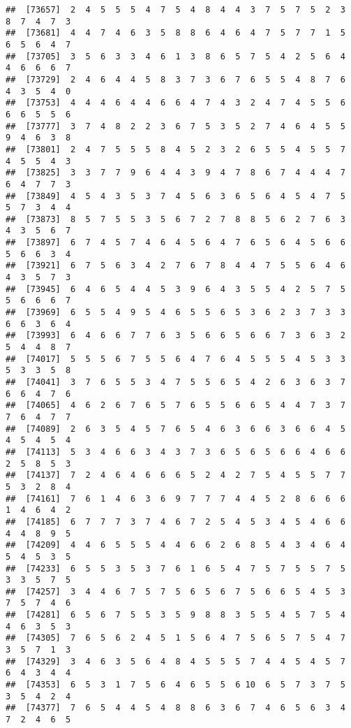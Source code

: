 \documentclass[
]{book}
\begin{document}
\begin{verbatim}
##  [73657]  2  4  5  5  5  4  7  5  4  8  4  4  3  7  5  7  5  2  3  8  7  4  7  3
##  [73681]  4  4  7  4  6  3  5  8  8  6  4  6  4  7  5  7  7  1  5  6  5  6  4  7
##  [73705]  3  5  6  3  3  4  6  1  3  8  6  5  7  5  4  2  5  6  4  4  6  6  6  7
##  [73729]  2  4  6  4  4  5  8  3  7  3  6  7  6  5  5  4  8  7  6  4  3  5  4  0
##  [73753]  4  4  4  6  4  4  6  6  4  7  4  3  2  4  7  4  5  5  6  6  6  5  5  6
##  [73777]  3  7  4  8  2  2  3  6  7  5  3  5  2  7  4  6  4  5  5  9  4  6  3  8
##  [73801]  2  4  7  5  5  5  8  4  5  2  3  2  6  5  5  4  5  5  7  4  5  5  4  3
##  [73825]  3  3  7  7  9  6  4  4  3  9  4  7  8  6  7  4  4  4  7  6  4  7  7  3
##  [73849]  4  5  4  3  5  3  7  4  5  6  3  6  5  6  4  5  4  7  5  5  7  3  4  4
##  [73873]  8  5  7  5  5  3  5  6  7  2  7  8  8  5  6  2  7  6  3  4  3  5  6  7
##  [73897]  6  7  4  5  7  4  6  4  5  6  4  7  6  5  6  4  5  6  6  5  6  6  3  4
##  [73921]  6  7  5  6  3  4  2  7  6  7  8  4  4  7  5  5  6  4  6  4  3  5  7  3
##  [73945]  6  4  6  5  4  4  5  3  9  6  4  3  5  5  4  2  5  7  5  5  6  6  6  7
##  [73969]  6  5  5  4  9  5  4  6  5  5  6  5  3  6  2  3  7  3  3  6  6  3  6  4
##  [73993]  6  4  6  6  7  7  6  3  5  6  6  5  6  6  7  3  6  3  2  5  4  4  8  7
##  [74017]  5  5  5  6  7  5  5  6  4  7  6  4  5  5  5  4  5  3  3  5  3  3  5  8
##  [74041]  3  7  6  5  5  3  4  7  5  5  6  5  4  2  6  3  6  3  7  6  6  4  7  6
##  [74065]  4  6  2  6  7  6  5  7  6  5  5  6  6  5  4  4  7  3  7  7  6  4  7  7
##  [74089]  2  6  3  5  4  5  7  6  5  4  6  3  6  6  3  6  6  4  5  4  5  4  5  4
##  [74113]  5  3  4  6  6  3  4  3  7  3  6  5  6  5  6  6  4  6  6  2  5  8  5  3
##  [74137]  7  2  4  6  4  6  6  6  5  2  4  2  7  5  4  5  5  7  7  5  3  2  8  4
##  [74161]  7  6  1  4  6  3  6  9  7  7  7  4  4  5  2  8  6  6  6  1  4  6  4  2
##  [74185]  6  7  7  7  3  7  4  6  7  2  5  4  5  3  4  5  4  6  6  4  4  8  9  5
##  [74209]  4  4  6  5  5  5  4  4  6  6  2  6  8  5  4  3  4  6  4  5  4  5  3  5
##  [74233]  6  5  5  3  5  3  7  6  1  6  5  4  7  5  7  5  5  7  5  3  3  5  7  5
##  [74257]  3  4  4  6  7  5  7  5  6  5  6  7  5  6  6  5  4  5  3  7  5  7  4  6
##  [74281]  6  5  6  7  5  5  3  5  9  8  8  3  5  5  4  5  7  5  4  4  6  3  5  3
##  [74305]  7  6  5  6  2  4  5  1  5  6  4  7  5  6  5  7  5  4  7  3  5  7  1  3
##  [74329]  3  4  6  3  5  6  4  8  4  5  5  5  7  4  4  5  4  5  7  6  4  3  4  4
##  [74353]  6  5  3  1  7  5  6  4  6  5  5  6 10  6  5  7  3  7  5  3  5  4  2  4
##  [74377]  7  6  5  4  4  5  4  8  8  6  3  6  7  4  6  5  6  3  4  7  2  4  6  5

\end{verbatim}
\end{document}
